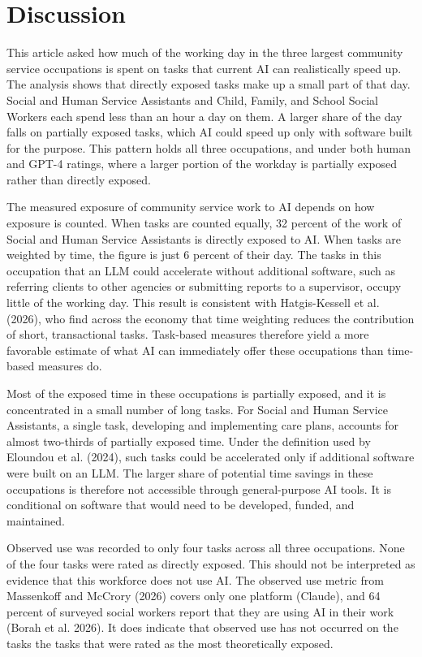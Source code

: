 \section{Discussion}

This article asked how much of the working day in the three largest community service occupations is spent on tasks that current AI can realistically speed up. The analysis shows that directly exposed tasks make up a small part of that day. Social and Human Service Assistants and Child, Family, and School Social Workers each spend less than an hour a day on them. A larger share of the day falls on partially exposed tasks, which AI could speed up only with software built for the purpose. This pattern holds all three occupations, and under both human and GPT-4 ratings, where a larger portion of the workday is partially exposed rather than directly exposed.

The measured exposure of community service work to AI depends on how exposure is counted. When tasks are counted equally, 32 percent of the work of Social and Human Service Assistants is directly exposed to AI. When tasks are weighted by time, the figure is just 6 percent of their day. The tasks in this occupation that an LLM could accelerate without additional software, such as referring clients to other agencies or submitting reports to a supervisor, occupy little of the working day. This result is consistent with Hatgis-Kessell et al. (2026), who find across the economy that time weighting reduces the contribution of short, transactional tasks. Task-based measures therefore yield a more favorable estimate of what AI can immediately offer these occupations than time-based measures do.

Most of the exposed time in these occupations is partially exposed, and it is concentrated in a small number of long tasks. For Social and Human Service Assistants, a single task, developing and implementing care plans, accounts for almost two-thirds of partially exposed time. Under the definition used by Eloundou et al. (2024), such tasks could be accelerated only if additional software were built on an LLM. The larger share of potential time savings in these occupations is therefore not accessible through general-purpose AI tools. It is conditional on software that would need to be developed, funded, and maintained.

Observed use was recorded to only four tasks across all three occupations. None of the four tasks were rated as directly exposed. This should not be interpreted as evidence that this workforce does not use AI. The observed use metric from Massenkoff and McCrory (2026) covers only one platform (Claude), and 64 percent of surveyed social workers report that they are using AI in their work (Borah et al. 2026). It does indicate that observed use has not occurred on the tasks the tasks that were rated as the most theoretically exposed.

